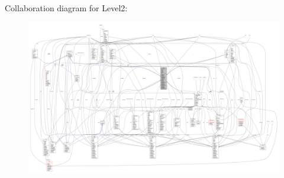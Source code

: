 Collaboration diagram for Level2\+:
\nopagebreak
\begin{figure}[H]
\begin{center}
\leavevmode
\includegraphics[width=350pt]{classscenes_1_1_level2__coll__graph}
\end{center}
\end{figure}
